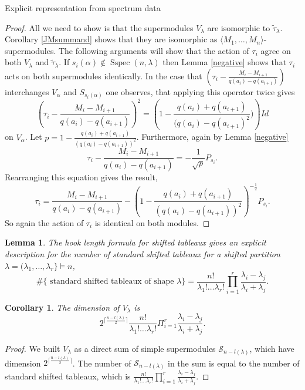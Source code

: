 \documentclass[a4paper,10pt]{amsart}
\newtheorem{corollary}[theorem]{Corollary}
\newtheorem{lemma}[theorem]{Lemma}
\DeclareMathOperator{\Sspec}{Sspec}
\begin{document}
\begin{section}{Explicit representation from spectrum data}
 \begin{proof} All we need to show is that the supermodules $V_\lambda$ are isomorphic to $\tilde{\tau}_\lambda$. Corollary \ref{JMsummand} shows that they are isomorphic as $\langle M_1,\ldots,M_n\rangle$-supermodules. The following arguments will show that the action of $\tau_i$ agree on both $V_\lambda$ and $\tilde{\tau}_\lambda$.
 If $s_i(\alpha) \notin \Sspec(n,\lambda)$ then Lemma \ref{negative} shows that $\tau_i$ acts on both supermodules identically. In the case that $(\tau_i - \frac{M_i -M_{i+1}}{q(a_i) - q(a_{i+1})} )$ interchanges $V_\alpha$ and $S_{s_i(\alpha)}$ one observes, that applying this operator twice gives 
 $$\left(\tau_i - \frac{M_i -M_{i+1}}{q(a_i) - q(a_{i+1})}\right) ^2 = \left(1 - \frac{q(a_i) +q(a_{i+1})}{(q(a_i) - q(a_{i+1})^2})\right)Id$$
 on $V_\alpha$.  Let $p = 1 - \frac{q(a_i) +q(a_{i+1})}{(q(a_i) - q(a_{i+1}))^2} $.
  Furthermore, again by Lemma \ref{negative}
  $$\tau_i - \frac{M_i -M_{i+1}}{q(a_i) - q(a_{i+1})}  = -\frac{1}{\sqrt{p}} P_{s_i}. $$ 
Rearranging this equation gives the result,
 $$\tau_i = \frac{M_i - M_{i+1}}{q(a_i) -q(a_{i+1})}- \left(1 - \frac{q(a_i) +q(a_{i+1})}{(q(a_i) - q(a_{i+1}))^2}\right)^{-\frac{1}{2}} P_{s_i} .$$
 So again the action of $\tau_i$ is identical on both modules.
 \end{proof}
 
 \begin{lemma} \cite[1.2]{S80} The hook length formula for shifted tableaux gives an explicit description for the number of standard shifted tableaux for a shifted partition $\lambda = (\lambda_1,\ldots ,\lambda_r\}  \vDash n$,
 $$\# \{\text{ standard shifted tableaux of shape }\lambda\} = \frac{n!}{\lambda_1!\ldots \lambda_r!} \prod_{i=1}^{r} \frac{\lambda_i - \lambda_j}{\lambda_i +\lambda_j}.$$ \end{lemma} 
 
 \begin{corollary}\label{dimension} The dimension of $V_\lambda$ is 
 $$2^{\lceil \frac{n-l(\lambda)}{2}\rceil}  \frac{n!}{\lambda_1!\ldots \lambda_r!} \Pi_{i=1}^{r} \frac{\lambda_i - \lambda_j}{\lambda_i +\lambda_j}.$$ \end{corollary} 
 
 
 \begin{proof} We built $V_\lambda$ as a direct sum of simple supermodules $\mathcal{S}_{n-l(\lambda)}$, which have dimension $2^{\lceil \frac{n-l(\lambda)}{2}\rceil}$. The number of $\mathcal{S}_{n-l(\lambda)}$ in the sum is equal to the number of standard shifted tableaux, which is $\frac{n!}{\lambda_1!\ldots \lambda_r!} \prod_{i=1}^{r} \frac{\lambda_i - \lambda_j}{\lambda_i +\lambda_j}$. \end{proof}


\end{section}
\end{document}
